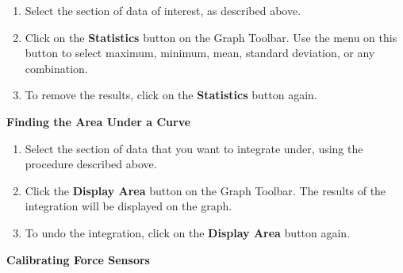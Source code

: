 \begin{enumerate}
\item Select the section of data of interest, as described above.
\item Click on the \textbf{Statistics} button on the Graph Toolbar. Use the menu on this button to select maximum, minimum, mean, standard deviation, or any combination.
\item To remove the results, click on the \textbf{Statistics} button again.
\end{enumerate}


\pagebreak[2]
\textbf{Finding the Area Under a Curve}

\begin{enumerate}
\item Select the section of data that you want to integrate under, using the procedure described above.
\item Click the \textbf{Display Area} button on the Graph Toolbar.
The results of the integration will be displayed on the graph.
\item To undo the integration, click on the \textbf{Display Area} button again.
\end{enumerate}

\textbf{Calibrating Force Sensors}

